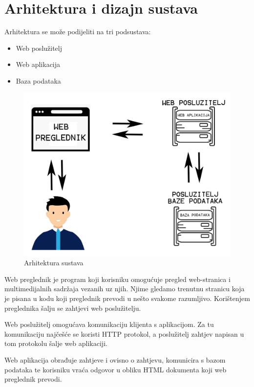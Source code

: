 \chapter{Arhitektura i dizajn sustava}

		Arhitektura se može podijeliti na tri podsustava:
		
		\begin{itemize}
			\item Web poslužitelj
			\item Web aplikacija
			\item Baza podataka
		\end{itemize}
		
		\begin{figure}[H]
			
			\centering
			\includegraphics[scale=0.25,keepaspectratio]{arhitektura}
			\caption{Arhitektura sustava}
			
		\end{figure}
	
		Web preglednik je program koji korisniku omogućuje pregled web-stranica i multimedijalnih sadržaja vezanih uz njih. Njime gledamo trenutnu stranicu koja je pisana u kodu koji preglednik prevodi u nešto svakome razumljivo. Korištenjem preglednika šalju se zahtjevi web poslužitelju.
		
		Web poslužitelj omogućava komunikaciju klijenta s aplikacijom. Za tu komunikaciju najčešće se koristi HTTP protokol, a poslužitelj zahtjev napisan u tom protokolu šalje web aplikaciji.
		
		Web aplikacija obrađuje zahtjeve i ovisno o zahtjevu, komunicira s bazom podataka te korisniku vraća odgovor u obliku HTML dokumenta koji web preglednik prevodi.
		

